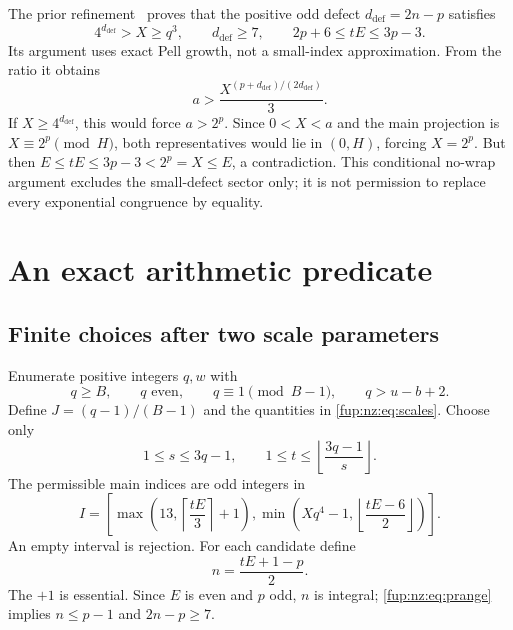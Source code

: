 \documentclass[11pt,letterpaper]{article}
\theoremstyle{definition}\newtheorem{definition}[theorem]{Definition}
\theoremstyle{remark}\newtheorem{remark}[theorem]{Remark}
\begin{document}
The prior refinement~\cite{fup:nz:refinement} proves that the positive odd defect $d_{\mathrm{def}}=2n-p$ satisfies
\begin{equation}\label{fup:nz:eq:defect}
 4^{d_{\mathrm{def}}}>X\ge q^3,\qquad d_{\mathrm{def}}\ge7,
 \qquad 2p+6\le tE\le3p-3.
\end{equation}
Its argument uses exact Pell growth, not a small-index approximation. From the ratio it obtains
\[
 a>\frac{X^{(p+d_{\mathrm{def}})/(2d_{\mathrm{def}})}}3.
\]
If $X\ge4^{d_{\mathrm{def}}}$, this would force $a>2^p$. Since $0<X<a$ and the main projection is $X\equiv2^p\pmod H$, both representatives would lie in $(0,H)$, forcing $X=2^p$. But then $E\le tE\le3p-3<2^p=X\le E$, a contradiction. This conditional no-wrap argument excludes the small-defect sector only; it is not permission to replace every exponential congruence by equality.

\section{An exact arithmetic predicate}\label{fup:nz:sec:predicate}
\subsection{Finite choices after two scale parameters}
Enumerate positive integers $q,w$ with
\begin{equation}\label{fup:nz:eq:qranges}
 q\ge B,\qquad q\text{ even},\qquad q\equiv1\pmod{B-1},\qquad
 q>u-b+2.
\end{equation}
Define $J=(q-1)/(B-1)$ and the quantities in \eqref{fup:nz:eq:scales}. Choose only
\begin{equation}\label{fup:nz:eq:stranges}
 1\le s\le3q-1,\qquad
 1\le t\le\left\lfloor\frac{3q-1}{s}\right\rfloor.
\end{equation}
The permissible main indices are odd integers in
\begin{equation}\label{fup:nz:eq:prange}
 I=\left[
 \max\!\left(13,\left\lceil\frac{tE}{3}\right\rceil+1\right),
 \min\!\left(Xq^4-1,\left\lfloor\frac{tE-6}{2}\right\rfloor\right)
 \right].
\end{equation}
An empty interval is rejection. For each candidate define
\begin{equation}\label{fup:nz:eq:n}
 n=\frac{tE+1-p}{2}.
\end{equation}
The $+1$ is essential. Since $E$ is even and $p$ odd, $n$ is integral; \eqref{fup:nz:eq:prange} implies $n\le p-1$ and $2n-p\ge7$.
\end{document}

